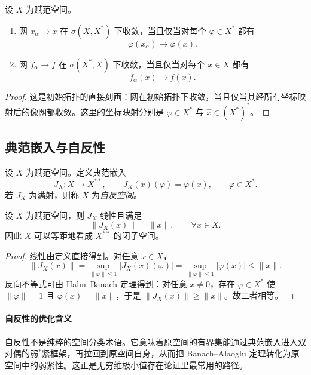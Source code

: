 \begin{proposition}[弱收敛与弱星收敛的判别]
设 $X$ 为赋范空间。
\begin{enumerate}
  \item 网 $x_\alpha\to x$ 在 $\sigma(X,X^\ast)$ 下收敛，当且仅当对每个 $\varphi\in X^\ast$ 都有
  \[
  \varphi(x_\alpha)\to \varphi(x).
  \]
  \item 网 $f_\alpha\to f$ 在 $\sigma(X^\ast,X)$ 下收敛，当且仅当对每个 $x\in X$ 都有
  \[
  f_\alpha(x)\to f(x).
  \]
\end{enumerate}
\end{proposition}

\begin{proof}
这是初始拓扑的直接刻画：网在初始拓扑下收敛，当且仅当其经所有坐标映射后的像网都收敛。这里的坐标映射分别是 $\varphi\in X^\ast$ 与 $\hat{x}\in (X^\ast)^\ast$。
\end{proof}

\subsection{典范嵌入与自反性}

\begin{definition}[自反空间]\label{def:reflexive-space}
设 $X$ 为赋范空间。定义典范嵌入
\[
J_X\colon X\to X^{\ast\ast},\qquad J_X(x)(\varphi)=\varphi(x),\qquad \varphi\in X^\ast.
\]
若 $J_X$ 为满射，则称 $X$ 为\emph{自反空间}。
\end{definition}

\begin{proposition}[典范嵌入是等距嵌入]
设 $X$ 为赋范空间，则 $J_X$ 线性且满足
\[
\|J_X(x)\|=\|x\|,\qquad \forall x\in X.
\]
因此 $X$ 可以等距地看成 $X^{\ast\ast}$ 的闭子空间。
\end{proposition}

\begin{proof}
线性由定义直接得到。对任意 $x\in X$，
\[
\|J_X(x)\|
=\sup_{\|\varphi\|\le 1}|J_X(x)(\varphi)|
=\sup_{\|\varphi\|\le 1}|\varphi(x)|
\le \|x\|.
\]
反向不等式可由 Hahn--Banach 定理得到：对任意 $x\neq 0$，存在 $\varphi\in X^\ast$ 使 $\|\varphi\|=1$ 且 $\varphi(x)=\|x\|$，于是 $\|J_X(x)\|\ge \|x\|$。故二者相等。
\end{proof}

\paragraph{自反性的优化含义}

\begin{remark}
自反性不是纯粹的空间分类术语。它意味着原空间的有界集能通过典范嵌入进入双对偶的弱$^\ast$紧框架，再拉回到原空间自身，从而把 Banach--Alaoglu 定理转化为原空间中的弱紧性。这正是无穷维极小值存在论证里最常用的路径。
\end{remark}

